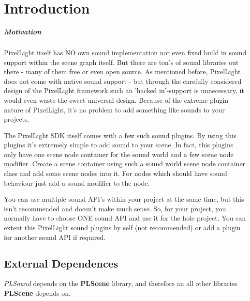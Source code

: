 \chapter{Introduction}


\paragraph{Motivation}
PixelLight itself has NO own sound implementation nor even fixed build in sound support within the scene graph itself. But there are ton's of sound libraries out there - many of them free or even open source. As mentioned before, PixelLight does not come with native sound support - but through the carefully considered design of the PixelLight framework such an 'hacked in'-support is unnecessary, it would even waste the sweet universal design. Because of the extreme plugin nature of PixelLight, it's no problem to add something like sounds to your projects.

The PixelLight SDK itself comes with a few such sound plugins. By using this plugins it's extremely simple to add sound to your scene. In fact, this plugins only have one scene node container for the sound world and a few scene node modifier. Create a scene container using such a sound world scene node container class and add some scene nodes into it. For nodes which should have sound behaviour just add a sound modifier to the node.

You can use multiple sound API's within your project at the same time, but this isn't recommended and doesn't make much sense. So, for your project, you normally have to choose ONE sound API and use it for the hole project. You can extent this PixelLight sound plugins by self (not recommended) or add a plugin for another sound API if required.




\section{External Dependences}
\emph{PLSound} depends on the \textbf{PLScene} library, and therefore an all other libraries \textbf{PLScene} depends on.
